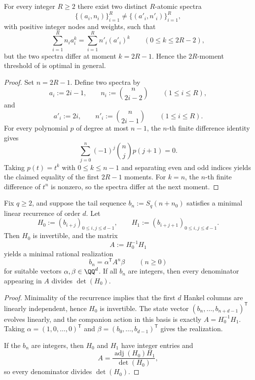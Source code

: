 \begin{theorem}
\label{thm:fiber-threshold-sharp}
For every integer \(R\ge 2\) there exist two distinct \(R\)-atomic spectra
\[
  \{(a_i,n_i)\}_{i=1}^R\neq \{(a'_i,n'_i)\}_{i=1}^R,
\]
with positive integer nodes and weights, such that
\[
  \sum_{i=1}^R n_i a_i^k
  =
  \sum_{i=1}^R n'_i (a'_i)^k
  \qquad (0\le k\le 2R-2),
\]
but the two spectra differ at moment \(k=2R-1\).  Hence the
\(2R\)-moment threshold of  is optimal in
general.
\end{theorem}

\begin{proof}
Set \(n=2R-1\).  Define two spectra by
\[
  a_i:=2i-1,
  \qquad
  n_i:=\binom{n}{2i-2}
  \qquad (1\le i\le R),
\]
and
\[
  a'_i:=2i,
  \qquad
  n'_i:=\binom{n}{2i-1}
  \qquad (1\le i\le R).
\]
For every polynomial \(p\) of degree at most \(n-1\), the \(n\)-th finite
difference identity gives
\[
  \sum_{j=0}^{n}(-1)^j\binom{n}{j}p(j+1)=0.
\]
Taking \(p(t)=t^k\) with \(0\le k\le n-1\) and separating even and odd indices
yields the claimed equality of the first \(2R-1\) moments.  For \(k=n\), the
\(n\)-th finite difference of \(t^n\) is nonzero, so the spectra differ at the
next moment.
\end{proof}

\begin{proposition}
\label{prop:hankel-realization}
Fix \(q\ge 2\), and suppose the tail sequence \(b_n:=S_q(n+n_0)\) satisfies a
minimal linear recurrence of order \(d\).  Let
\[
  H_0:=(b_{i+j})_{0\le i,j\le d-1},
  \qquad
  H_1:=(b_{i+j+1})_{0\le i,j\le d-1}.
\]
Then \(H_0\) is invertible, and the matrix
\[
  A:=H_0^{-1}H_1
\]
yields a minimal rational realization
\[
  b_n=\alpha^{\mathsf T}A^n\beta
  \qquad (n\ge 0)
\]
for suitable vectors \(\alpha,\beta\in\QQ^d\).  If all \(b_n\) are integers,
then every denominator appearing in \(A\) divides \(\det(H_0)\).
\end{proposition}

\begin{proof}
Minimality of the recurrence implies that the first \(d\) Hankel columns are
linearly independent, hence \(H_0\) is invertible.  The state vector
\((b_n,\dots,b_{n+d-1})^{\mathsf T}\) evolves linearly, and the companion action
in this basis is exactly \(A=H_0^{-1}H_1\).  Taking
\(\alpha=(1,0,\dots,0)^{\mathsf T}\) and
\(\beta=(b_0,\dots,b_{d-1})^{\mathsf T}\) gives the realization.

If the \(b_n\) are integers, then \(H_0\) and \(H_1\) have integer entries and
\[
  A=\frac{\operatorname{adj}(H_0)H_1}{\det(H_0)},
\]
so every denominator divides \(\det(H_0)\).
\end{proof}

